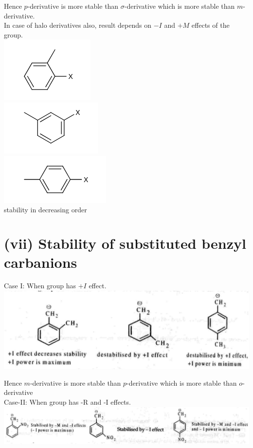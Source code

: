 \documentclass[10pt]{article}
\begin{document}
Hence $p$-derivative is more stable than $\sigma$-derivative which is more stable than $m$-derivative.\\
In case of halo derivatives also, result depends on $-I$ and $+M$ effects of the group.\\
\includegraphics{smile-12135a6a6583f5cadb3cde866ea329df36a89e47}\\
\includegraphics{smile-5a2b3bf032293845447fa2e48bfbb807ccf22e8e}\\
\includegraphics{smile-f8a25e9a9bb81022fda6a84b0b2f181c2c425d09}\\
stability in decreasing order

\section*{(vii) Stability of substituted benzyl carbanions}
Case I: When group has $+I$ effect.\\
\includegraphics[max width=\textwidth, center]{2025_01_28_8470952b98110cec3aabg-076(3)}

Hence $m$-derivative is more stable than $p$-derivative which is more stable than $o$-derivative\\
Case-II: When group has -R and -I effects.\\
\includegraphics[max width=\textwidth, center]{2025_01_28_8470952b98110cec3aabg-076(2)}
\end{document}
